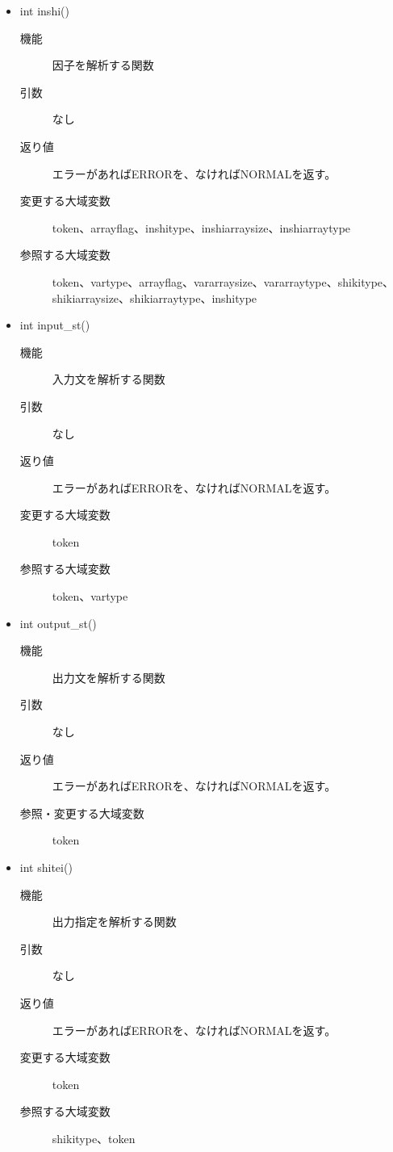 \documentclass{jarticle}
\begin{document}
\begin{itemize}
\item int inshi()
\begin{description}
\item[機能]因子を解析する関数
\item[引数]なし
\item[返り値]エラーがあればERRORを、なければNORMALを返す。
\item[変更する大域変数]token、arrayflag、inshitype、inshiarraysize、inshiarraytype
\item[参照する大域変数]token、vartype、arrayflag、vararraysize、vararraytype、shikitype、shikiarraysize、shikiarraytype、inshitype
\end{description}
\item int input\_st()
\begin{description}
\item[機能]入力文を解析する関数
\item[引数]なし
\item[返り値]エラーがあればERRORを、なければNORMALを返す。
\item[変更する大域変数]token
\item[参照する大域変数]token、vartype
\end{description}
\item int output\_st()
\begin{description}
\item[機能]出力文を解析する関数
\item[引数]なし
\item[返り値]エラーがあればERRORを、なければNORMALを返す。
\item[参照・変更する大域変数]token
\end{description}
\item int shitei()
\begin{description}
\item[機能]出力指定を解析する関数
\item[引数]なし
\item[返り値]エラーがあればERRORを、なければNORMALを返す。
\item[変更する大域変数]token
\item[参照する大域変数]shikitype、token
\end{description}
\end{itemize}
\end{document}

